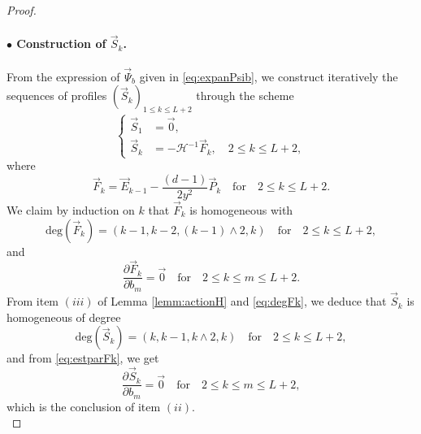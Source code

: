 \documentclass[11pt]{aims}
\theoremstyle{definition}
\numberwithin{equation}{section}
\begin{document}
\begin{proof}
\paragraph{$\bullet$ Construction of $\vec S_k$.} From the expression of $\vec \Psi_b$ given in \eqref{eq:expanPsib}, we construct iteratively the sequences of profiles $(\vec S_k)_{1 \leq k \leq L+2}$ through the scheme
\begin{equation}\label{def:Sk}
\left\{\begin{array}{ll}
\vec S_1 &= \vec 0, \\
\vec S_k &= - {\mathscr{H}}^{-1}\vec F_k, \quad 2 \leq k \leq L+2,
\end{array}\right.
\end{equation}
where 
$$\vec F_k = \vec E_{k-1} - \frac{(d-1)}{2y^2}\vec P_{k} \quad \text{for} \quad 2\leq k \leq L+2.$$
We claim by induction on $k$ that $\vec F_k$ is homogeneous with 
\begin{equation}\label{eq:degFk}
\text{deg}(\vec F_k) = (k-1, k-2, (k - 1)\wedge2, k) \quad \text{for} \quad 2 \leq k \leq L+2,
\end{equation}
and 
\begin{equation}\label{eq:estparFk}
\frac{\partial \vec F_k}{\partial b_m} = \vec 0 \quad \text{for}\quad 2 \leq k \leq m \leq L+2.
\end{equation}
From item $(iii)$ of Lemma \ref{lemm:actionH} and \eqref{eq:degFk}, we deduce that $\vec S_k$ is homogeneous of degree
$$\text{deg}(\vec S_k) = (k,k-1, k\wedge2, k) \quad \text{for}\quad 2 \leq k \leq L+2,$$
and from \eqref{eq:estparFk}, we get
$$\frac{\partial \vec S_k}{\partial b_m} = \vec 0 \quad \text{for} \quad 2 \leq k \leq m \leq L+2,$$
which is the conclusion of item $(ii)$.\\


\end{proof}
\end{document}
